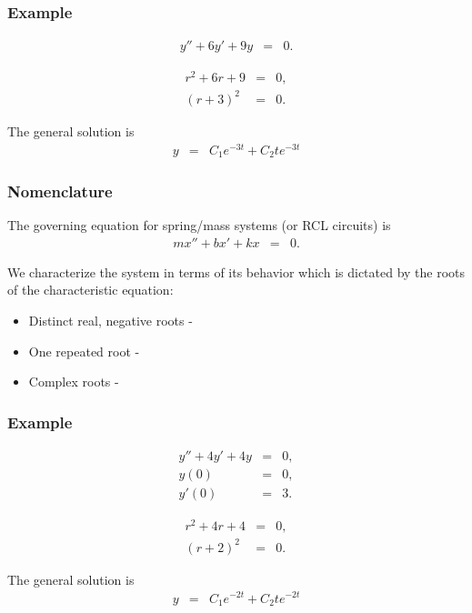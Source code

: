 \begin{frame}
  \frametitle{Example}

  \begin{eqnarray*}
    y'' + 6y' + 9y & = & 0.
  \end{eqnarray*}

  {
    \begin{eqnarray*}
      r^2 + 6r + 9 & = & 0, \\
      (r+3)^2 & = & 0.
    \end{eqnarray*}

    The general solution is
    \begin{eqnarray*}
      y & = & C_1 e^{-3t} + C_2 t e^{-3t}
    \end{eqnarray*}

  }

\end{frame}


\begin{frame}
  \frametitle{Nomenclature}

  The governing equation for spring/mass systems (or RCL circuits) is
  \begin{eqnarray*}
    m x'' + b x' + k x & = & 0.
  \end{eqnarray*}

  We characterize the system in terms of its behavior which is
  dictated by the roots of the characteristic equation:
  \begin{itemize}
  \item Distinct real, negative roots - \textit{}
  \item One repeated root - \textit{}
  \item Complex roots - \textit{}
  \end{itemize}

\end{frame}

\begin{frame}
  \frametitle{Example}

  \begin{eqnarray*}
    y'' + 4y' + 4y & = & 0, \\
    y(0) & = & 0, \\
    y'(0) & = & 3.
  \end{eqnarray*}

  {
    \begin{eqnarray*}
      r^2 + 4r + 4 & = & 0, \\
      (r+2)^2 & = & 0.
    \end{eqnarray*}

    The general solution is
    \begin{eqnarray*}
      y & = & C_1 e^{-2t} + C_2 t e^{-2t}
    \end{eqnarray*}

  }

\end{frame}




